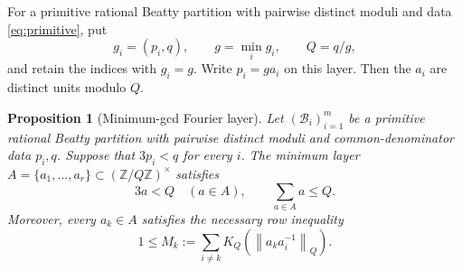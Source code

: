 \documentclass[11pt]{article}
\newtheorem{proposition}[theorem]{Proposition}
\theoremstyle{definition}
\theoremstyle{remark}
\newcommand{\U}{(\mathbb Z/Q\mathbb Z)^\times}
\newcommand{\B}{\mathcal B}
\newcommand{\normQ}[1]{\left\lVert #1\right\rVert_Q}
\begin{document}
For a primitive rational Beatty partition with pairwise distinct moduli and
data \eqref{eq:primitive}, put
\[
 g_i=(p_i,q),\qquad g=\min_i g_i,\qquad Q=q/g,
\]
and retain the indices with \(g_i=g\).  Write \(p_i=ga_i\) on this layer.
Then the \(a_i\) are distinct units modulo \(Q\).

\begin{proposition}[Minimum-gcd Fourier layer]\label{prop:minimum-layer}
Let \((\B_i)_{i=1}^m\) be a primitive rational Beatty partition with
pairwise distinct moduli and common-denominator data \(p_i,q\).  Suppose that
\(3p_i<q\) for every \(i\).  The minimum layer
\(A=\{a_1,\ldots,a_r\}\subset\U\) satisfies
\begin{equation}\label{eq:subcritical-data}
 3a<Q\quad(a\in A),\qquad \sum_{a\in A}a\le Q.
\end{equation}
Moreover, every \(a_k\in A\) satisfies the necessary row inequality
\begin{equation}\label{eq:row-condition}
 1\le M_k:=\sum_{i\ne k}
 K_Q\!\left(\normQ{a_ka_i^{-1}}\right).
\end{equation}
\end{proposition}
\end{document}
